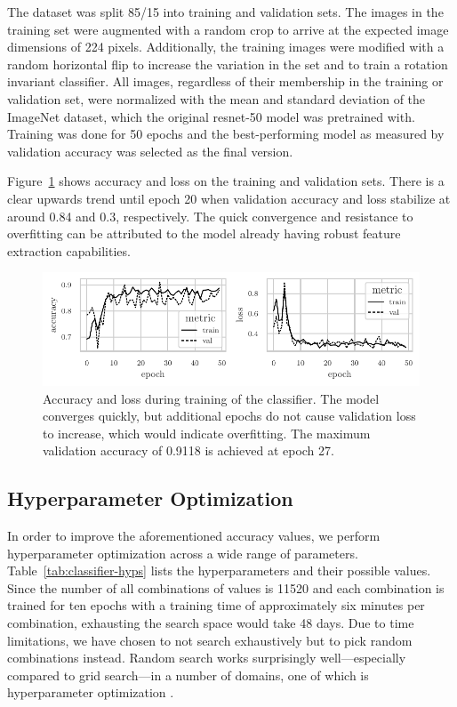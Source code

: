 \documentclass[draft,final]{vutinfth} %
\begin{document}
The dataset was split 85/15 into training and validation sets. The
images in the training set were augmented with a random crop to arrive
at the expected image dimensions of \num{224} pixels. Additionally,
the training images were modified with a random horizontal flip to
increase the variation in the set and to train a rotation invariant
classifier. All images, regardless of their membership in the training
or validation set, were normalized with the mean and standard
deviation of the ImageNet \cite{deng2009} dataset, which the original
\gls{resnet}-50 model was pretrained with. Training was done for
\num{50} epochs and the best-performing model as measured by
validation accuracy was selected as the final version.

Figure~\ref{fig:classifier-training-metrics} shows accuracy and loss
on the training and validation sets. There is a clear upwards trend
until epoch \num{20} when validation accuracy and loss stabilize at
around \num{0.84} and \num{0.3}, respectively. The quick convergence
and resistance to overfitting can be attributed to the model already
having robust feature extraction capabilities.

\begin{figure}
  \centering
  \includegraphics{graphics/classifier-metrics.pdf}
  \caption[Classifier accuracy and loss during training.]{Accuracy and
    loss during training of the classifier. The model converges
    quickly, but additional epochs do not cause validation loss to
    increase, which would indicate overfitting. The maximum validation
    accuracy of \num{0.9118} is achieved at epoch \num{27}.}
  \label{fig:classifier-training-metrics}
\end{figure}

\subsection{Hyperparameter Optimization}
\label{ssec:class-hypopt}

In order to improve the aforementioned accuracy values, we perform
hyperparameter optimization across a wide range of
parameters. Table~\ref{tab:classifier-hyps} lists the hyperparameters
and their possible values. Since the number of all combinations of
values is \num{11520} and each combination is trained for ten epochs
with a training time of approximately six minutes per combination,
exhausting the search space would take \num{48} days. Due to time
limitations, we have chosen to not search exhaustively but to pick
random combinations instead. Random search works surprisingly
well---especially compared to grid search---in a number of domains, one of
which is hyperparameter optimization \cite{bergstra2012}.
\end{document}
